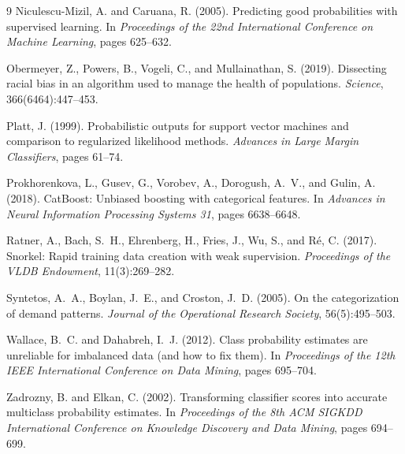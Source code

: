 \documentclass[11pt]{article}
\begin{document}
\begin{thebibliography}{9}
Niculescu-Mizil, A. and Caruana, R. (2005).
\newblock Predicting good probabilities with supervised learning.
\newblock In \emph{Proceedings of the 22nd International Conference on Machine Learning}, pages 625--632.

Obermeyer, Z., Powers, B., Vogeli, C., and Mullainathan, S. (2019).
\newblock Dissecting racial bias in an algorithm used to manage the health of populations.
\newblock \emph{Science}, 366(6464):447--453.

Platt, J. (1999).
\newblock Probabilistic outputs for support vector machines and comparison to regularized likelihood methods.
\newblock \emph{Advances in Large Margin Classifiers}, pages 61--74.

Prokhorenkova, L., Gusev, G., Vorobev, A., Dorogush, A.~V., and Gulin, A. (2018).
\newblock CatBoost: Unbiased boosting with categorical features.
\newblock In \emph{Advances in Neural Information Processing Systems 31}, pages 6638--6648.

Ratner, A., Bach, S.~H., Ehrenberg, H., Fries, J., Wu, S., and R\'e, C. (2017).
\newblock Snorkel: Rapid training data creation with weak supervision.
\newblock \emph{Proceedings of the VLDB Endowment}, 11(3):269--282.

Syntetos, A.~A., Boylan, J.~E., and Croston, J.~D. (2005).
\newblock On the categorization of demand patterns.
\newblock \emph{Journal of the Operational Research Society}, 56(5):495--503.

Wallace, B.~C. and Dahabreh, I.~J. (2012).
\newblock Class probability estimates are unreliable for imbalanced data (and how to fix them).
\newblock In \emph{Proceedings of the 12th IEEE International Conference on Data Mining}, pages 695--704.

Zadrozny, B. and Elkan, C. (2002).
\newblock Transforming classifier scores into accurate multiclass probability estimates.
\newblock In \emph{Proceedings of the 8th ACM SIGKDD International Conference on Knowledge Discovery and Data Mining}, pages 694--699.

\end{thebibliography}
\endgroup
\end{document}
